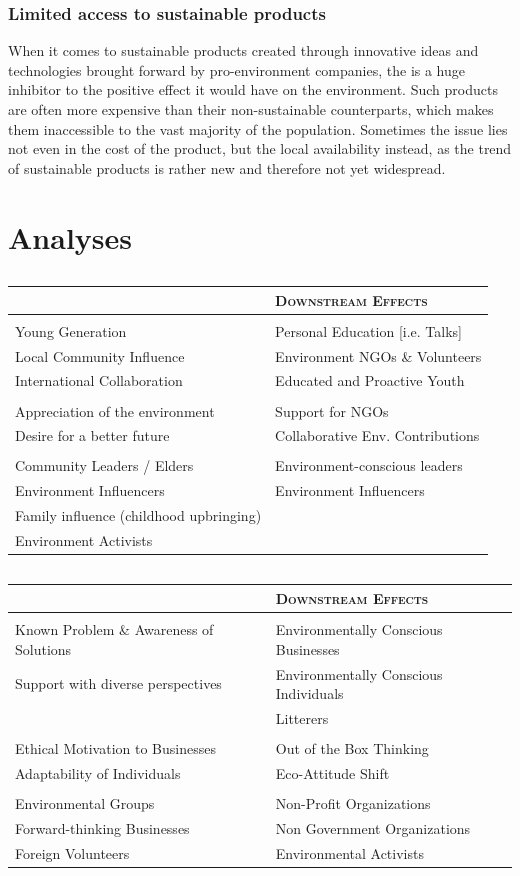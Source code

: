 \documentclass{article}
\newenvironment{SATAnalysis}{
  \vspace{0.25cm}
  \begin{tabular}{>{\raggedright\arraybackslash}p{0.45\textwidth} >{\raggedleft\arraybackslash}p{0.45\textwidth}}
  {\Large \textsc{Upstream Causes}} & {\Large \textsc{Downstream Effects}}\\
}{
  \bottomrule
  \end{tabular}
  \vspace{0.5cm}
}
\newcommand{\SATStructural}{\midrule\multicolumn{2}{c}{\Large \textsc{Structural}}\\ \midrule}
\newcommand{\SATAttitudinal}{\midrule\multicolumn{2}{c}{\Large \textsc{Attitudinal}}\\ \midrule}
\newcommand{\SATTransactional}{\midrule\multicolumn{2}{c}{\Large \textsc{Transactional}}\\ \midrule}
\newcommand{\SATCause}[1]{#1 & \\}
\newcommand{\SATEffect}[1]{ & #1\\}
\newcommand{\SATCauseEffect}[2]{#1 & #2\\}
\newcommand{\hlitheme}[1]{\textbf{\color{purple}{#1}}}
\begin{document}
\subsubsection{Limited access to sustainable products}
\label{subsubsec:limited-access-to-sustainable-products}
When it comes to sustainable products created through innovative
ideas and technologies brought forward by pro-environment
companies, the \hlitheme{limited access to such products} is a huge
inhibitor to the positive effect it would have on the environment.
Such products are often more expensive than their non-sustainable
counterparts, which makes them inaccessible to the vast majority
of the population.
Sometimes the issue lies not even in the cost of the product, but
the local availability instead, as the trend of sustainable products
is rather new and therefore not yet widespread.

\newpage

\section{Analyses}
\subsection{}
\begin{SATAnalysis}
  \SATStructural
  \SATCauseEffect{Young Generation}{Personal Education [i.e. Talks]}
  \SATCauseEffect{Local Community Influence}{Environment NGOs \& Volunteers}
  \SATCauseEffect{International Collaboration}{Educated and Proactive Youth}
  \SATAttitudinal
  \SATCauseEffect{Appreciation of the environment}{Support for NGOs}
  \SATCauseEffect{Desire for a better future}{Collaborative Env. Contributions}
  \SATTransactional
  \SATCauseEffect{Community Leaders / Elders}{Environment-conscious leaders}
  \SATCauseEffect{Environment Influencers}{Environment Influencers}
  \SATCause{Family influence (childhood upbringing)}
  \SATCause{Environment Activists}
\end{SATAnalysis}

\subsection{}
\begin{SATAnalysis}
  \SATStructural
  \SATCauseEffect{Known Problem \& Awareness of Solutions}{Environmentally Conscious Businesses}
  \SATCauseEffect{Support with diverse perspectives}{Environmentally Conscious Individuals}
  \SATEffect{Litterers}
  \SATAttitudinal
  \SATCauseEffect{Ethical Motivation to Businesses}{Out of the Box Thinking}
  \SATCauseEffect{Adaptability of Individuals}{Eco-Attitude Shift}
  \SATTransactional
  \SATCauseEffect{Environmental Groups}{Non-Profit Organizations}
  \SATCauseEffect{Forward-thinking Businesses}{Non Government Organizations}
  \SATCauseEffect{Foreign Volunteers}{Environmental Activists}
\end{SATAnalysis}
\end{document}
